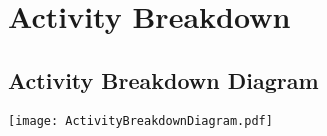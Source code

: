 \documentclass[../report.tex]{subfiles}
\begin{document}
\graphicspath{{img/}{../img/}}

\newpage

\section{Activity Breakdown}

\begin{landscape}

\subsection{Activity Breakdown Diagram}

\texttt{[image: ActivityBreakdownDiagram.pdf]}


\end{landscape}
\end{document}
